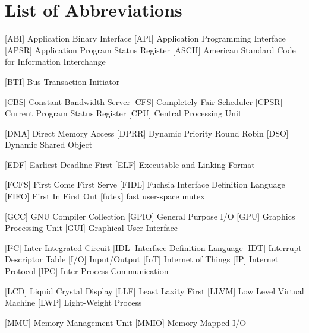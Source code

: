 
\chapter*{List of Abbreviations}

\begin{acronym} [POSIX]
 [ABI] {Application Binary Interface}
 [API] {Application Programming Interface}
 [APSR] {Application Program Status Register}
 [ASCII] {American Standard Code for Information Interchange}

 [BTI] {Bus Transaction Initiator}

 [CBS] {Constant Bandwidth Server}
 [CFS] {Completely Fair Scheduler}
 [CPSR] {Current Program Status Register}
 [CPU] {Central Processing Unit}

 [DMA] {Direct Memory Access}
 [DPRR] {Dynamic Priority Round Robin}
 [DSO] {Dynamic Shared Object}

 [EDF] {Earliest Deadline First}
 [ELF] {Executable and Linking Format}

 [FCFS] {First Come First Serve}
 [FIDL] {Fuchsia Interface Definition Language}
 [FIFO] {First In First Out}
 [futex] {fast user-space mutex}

 [GCC] {GNU Compiler Collection}
[GPIO] {General Purpose I/O}
 [GPU] {Graphics Processing Unit}
 [GUI] {Graphical User Interface}


 [I²C] {Inter Integrated Circuit}
 [IDL] {Interface Definition Language}
 [IDT] {Interrupt Descriptor Table}
 [I/O] {Input/Output}
[IoT] {Internet of Things}
 [IP] {Internet Protocol}
[IPC] {Inter-Process Communication}



 [LCD] {Liquid Crystal Display}
 [LLF] {Least Laxity First}
 [LLVM] {Low Level Virtual Machine}
 [LWP] {Light-Weight Process}

 [MMU] {Memory Management Unit}
[MMIO] {Memory Mapped I/O}




\end{acronym}
